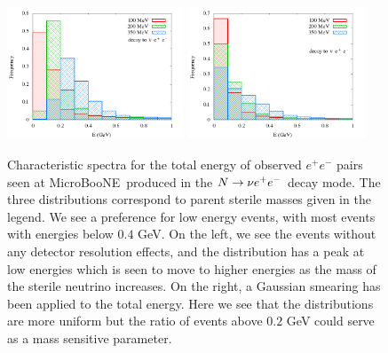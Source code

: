 \documentclass[11pt, a4paper]{article}
\def\muboone{MicroBooNE}
\def\ster{\ensuremath N}
\begin{document}
\begin{figure}[t]
%
\center
%
\includegraphics[width=0.47\textwidth]{figures/spectrum_ee_truth.png} \includegraphics[width=0.47\textwidth]{figures/spectrum_ee_smeared.png}
%
\caption{\label{fig:spectrum_ee} Characteristic spectra for the total energy of observed  $e^+e^-$ pairs seen at \muboone\ produced in the $\ster \to \nu e^+e^-$ decay mode. The three distributions correspond to parent sterile masses given in the legend. We see a preference for low energy events, with most events with energies below $0.4$ GeV. On the left, we see the events without any detector resolution effects, and the distribution has a peak at low energies which is seen to move to higher energies as the mass of the sterile neutrino increases. On the right, a Gaussian smearing has been applied to the total energy. Here we see that the distributions are more uniform but the ratio of events above $0.2$ GeV could serve as a mass sensitive parameter.}
%
\end{figure}
 
\end{document}
